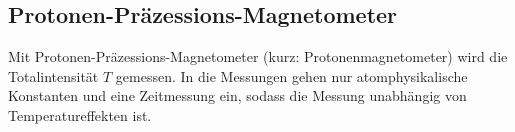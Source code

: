 \subsection{Protonen-Präzessions-Magnetometer}

Mit Protonen-Präzessions-Magnetometer (kurz: Protonenmagnetometer) wird die Totalintensität $T$ gemessen. In die Messungen gehen nur atomphysikalische Konstanten und eine Zeitmessung ein, sodass die Messung unabhängig von Temperatureffekten ist.